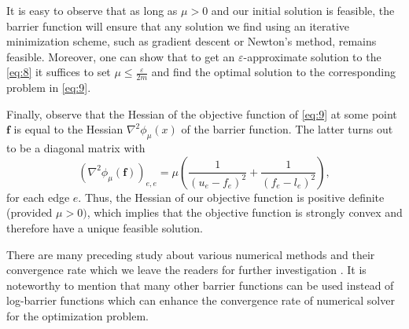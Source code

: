 \documentclass{article} %
\theoremstyle{bfnote}
\begin{document}
%


It is easy to observe that as long as $\mu>0$ and our initial solution is feasible, the barrier function will ensure that any solution we find using an iterative minimization scheme, such as gradient descent or Newton's method, remains feasible. Moreover, one can show that to get an $\varepsilon$-approximate solution to the \cref{eq:8} it suffices to set $\mu \leq \frac{\varepsilon}{2 m}$ and find the optimal solution to the corresponding problem in \cref{eq:9}.\citep{boyd2004, bubeck2015}

Finally, observe that the Hessian of the objective function of \cref{eq:9} at some point $\bm{f}$ is equal to the Hessian $\nabla^2 \phi_\mu(x)$ of the barrier function. The latter turns out to be a diagonal matrix with
\begin{equation*}
	\left(\nabla^2 \phi_\mu(\bm{f})\right)_{e, e}=\mu\left(\frac{1}{\left(u_e-f_e\right)^2}+\frac{1}{\left(f_e-l_e\right)^2}\right),
\end{equation*}
for each edge $e$. Thus, the Hessian of our objective function is positive definite (provided $\mu>0)$, which implies that the objective function is strongly convex and therefore have a unique feasible solution.

There are many preceding study about various numerical methods and their convergence rate which we leave the readers for further investigation \citep{bertsimas1997, boyd2004, bubeck2015}. It is noteworthy to mention that many other barrier functions can be used instead of log-barrier functions which can enhance the convergence rate of numerical solver for the optimization problem. \citep{cohen2020, lee2020, axiotis2022, brand2021c, chen2022a}
\end{document}
